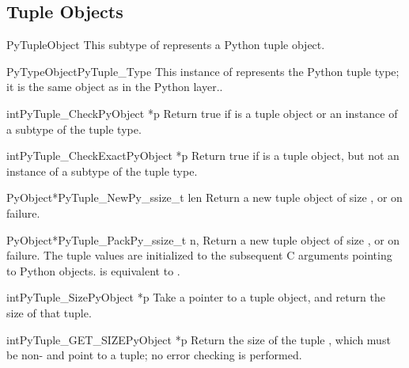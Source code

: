 \subsection{Tuple Objects \label{tupleObjects}}

\begin{ctypedesc}{PyTupleObject}
  This subtype of  represents a Python tuple object.
\end{ctypedesc}

\begin{cvardesc}{PyTypeObject}{PyTuple_Type}
  This instance of  represents the Python tuple
  type; it is the same object as  in the Python
  layer..
\end{cvardesc}

\begin{cfuncdesc}{int}{PyTuple_Check}{PyObject *p}
  Return true if  is a tuple object or an instance of a subtype
  of the tuple type.
\end{cfuncdesc}

\begin{cfuncdesc}{int}{PyTuple_CheckExact}{PyObject *p}
  Return true if  is a tuple object, but not an instance of a
  subtype of the tuple type.
\end{cfuncdesc}

\begin{cfuncdesc}{PyObject*}{PyTuple_New}{Py_ssize_t len}
  Return a new tuple object of size , or \NULL{} on failure.
\end{cfuncdesc}

\begin{cfuncdesc}{PyObject*}{PyTuple_Pack}{Py_ssize_t n, \moreargs}
  Return a new tuple object of size , or \NULL{} on failure.
  The tuple values are initialized to the subsequent  C arguments
  pointing to Python objects.  
  is equivalent to .
\end{cfuncdesc}

\begin{cfuncdesc}{int}{PyTuple_Size}{PyObject *p}
  Take a pointer to a tuple object, and return the size of that
  tuple.
\end{cfuncdesc}

\begin{cfuncdesc}{int}{PyTuple_GET_SIZE}{PyObject *p}
  Return the size of the tuple , which must be non-\NULL{} and
  point to a tuple; no error checking is performed.
\end{cfuncdesc}

